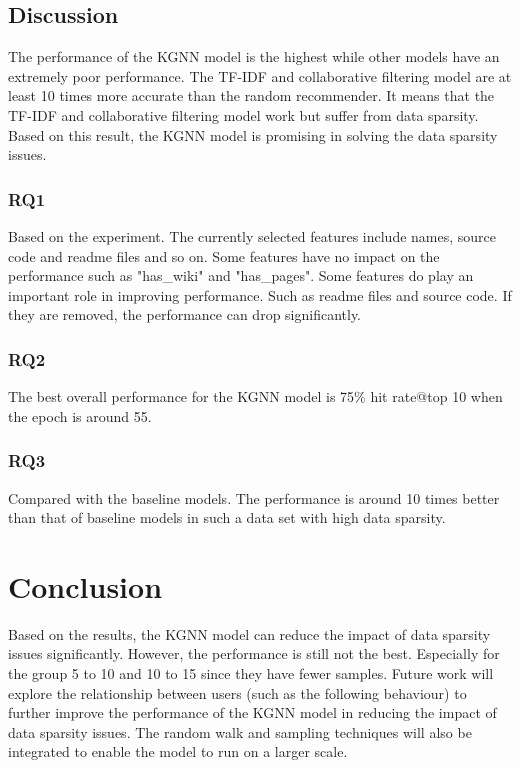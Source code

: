 \documentclass[11pt,twoside]{report}
\begin{document}
\section{Discussion}
The performance of the KGNN model is the highest while other models have an extremely poor performance. The TF-IDF and collaborative filtering model are at least 10 times more accurate than the random recommender. It means that the TF-IDF and collaborative filtering model work but suffer from data sparsity. Based on this result, the KGNN model is promising in solving the data sparsity issues.

\subsection{RQ1}
Based on the experiment. The currently selected features include names, source code and readme files and so on. Some features have no impact on the performance such as "has\_wiki" and "has\_pages". Some features do play an important role in improving performance. Such as readme files and source code. If they are removed, the performance can drop significantly.

\subsection{RQ2}
The best overall performance for the KGNN model is 75\% hit rate@top 10 when the epoch is around 55.

\subsection{RQ3}
Compared with the baseline models. The performance is around 10 times better than that of baseline models in such a data set with high data sparsity.

\chapter{Conclusion}
Based on the results, the KGNN model can reduce the impact of data sparsity issues significantly. However, the performance is still not the best. Especially for the group 5 to 10 and 10 to 15 since they have fewer samples. Future work will explore the relationship between users (such as the following behaviour) to further improve the performance of the KGNN model in reducing the impact of data sparsity issues. The random walk and sampling techniques will also be integrated to enable the model to run on a larger scale.




\end{document}
